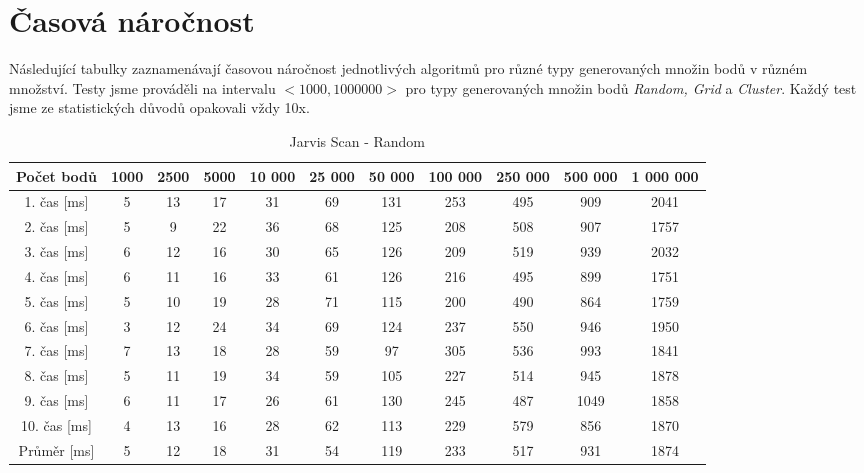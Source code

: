 \documentclass{article}
\begin{document}
\section{Časová náročnost}
Následující tabulky zaznamenávají časovou náročnost jednotlivých algoritmů pro různé typy generovaných množin bodů v různém množství. Testy jsme prováděli na intervalu  $ <1000,1000000>$ pro typy generovaných množin bodů \emph{Random, Grid} a \emph{Cluster}. Každý test jsme ze statistických důvodů opakovali vždy 10x.
\begin{center}
	\begin{table}[]
	\centering
	\caption{Jarvis Scan - Random}
	\label{my-label}
	\begin{tabular}{|c|c|c|c|c|c|c|c|c|c|c|}
		\hline 
 	Počet bodů&  1000& 2500 & 5000 & 10 000 & 25 000 & 50 000  & 100 000  & 250 000  & 500 000 & 1 000 000  \\ \hline \hline
 		1. čas [ms]&  5&  13&  17&  31& 69 &    131&  253&  495&  909&  2041\\ \hline
 		2. čas [ms]&  5&    9&  22&  36&  68&    125&  208&  508&  907&  1757\\ \hline
 		3. čas [ms]&  6&  12&  16&  30&  65&    126&  209&  519&  939&  2032\\ \hline
 		4. čas [ms]&  6&  11&  16&  33&  61&    126&  216&  495&  899&  1751\\ \hline
 		5. čas [ms]&  5&  10&  19&  28&  71&   115 &  200&  490&  864&  1759\\ \hline
 		6. čas [ms]&  3&  12&  24&  34&  69&    124&  237&  550&  946&  1950\\ \hline
 		7. čas [ms]&  7&  13&  18&  28&  59&      97&  305&  536&  993&  1841\\ \hline
 		8. čas [ms]&  5&  11&  19&  34&  59&    105&  227&  514&  945&  1878\\ \hline
 		9. čas [ms]&  6&  11&  17&  26&  61&    130&  245&  487&  1049&  1858\\ \hline
		10. čas [ms]& 4 & 13 &  16&  28&  62&  113&  229&  579&  856&  1870\\ \hline \hline
 		Průměr [ms]& 5& 12 &18  &31  &54  &119  &233  &517  &931  & 1874 \\ \hline
	\end{tabular}


\end{table}
\end{center}
\end{document}
